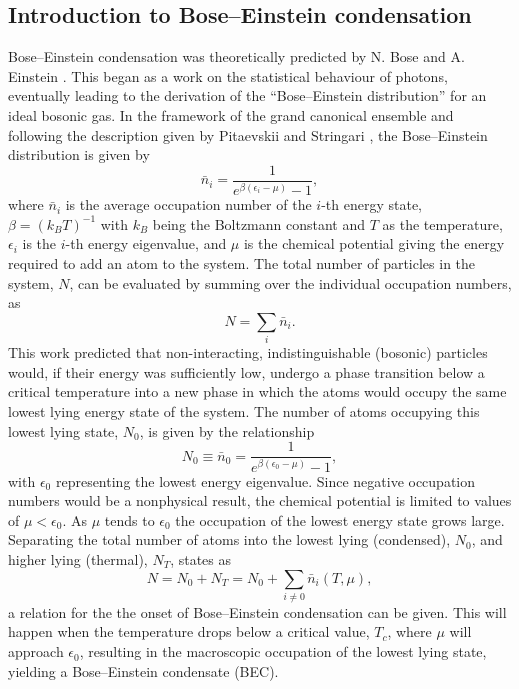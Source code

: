 \subsection{Introduction to Bose--Einstein condensation}\label{sub:becintro}
Bose--Einstein condensation was theoretically predicted by N. Bose and A. Einstein \cite{BEC:Ketterle_revmod_2002}. This began as a work on the statistical behaviour of photons, eventually leading to the derivation of the ``Bose--Einstein distribution'' for an ideal bosonic gas.
In the framework of the grand canonical ensemble and following the description given by Pitaevskii and Stringari \cite[chap. 2]{BK:Pitaevskii_Stringari_2003}, the Bose--Einstein distribution is given by
\begin{equation}
\bar{n}_i = \frac{1}{e^{\beta(\epsilon_i - \mu)} -1},
\end{equation}
where $\bar{n}_i$ is the average occupation number of the $i$-th energy state, $\beta=(k_BT)^{-1}$ with $k_B$ being the Boltzmann constant and $T$ as the temperature, $\epsilon_i$ is the $i$-th energy eigenvalue, and $\mu$ is the chemical potential giving the energy required to add an atom to the system.
The total number of particles in the system, $N$, can be evaluated by summing over the individual occupation numbers, as
\begin{equation}
N=\displaystyle\sum_i \bar{n}_i.
\end{equation}
This work predicted that non-interacting, indistinguishable (bosonic) particles would, if their energy was sufficiently low, undergo a phase transition below a critical temperature into a new phase in which the atoms would occupy the same lowest lying energy state of the system. The number of atoms occupying this lowest lying state, $N_0$, is given by the relationship
\begin{equation}
N_0 \equiv \bar{n}_0 = \frac{1}{e^{\beta(\epsilon_0 - \mu)} - 1},
\end{equation}
with $\epsilon_0$ representing the lowest energy eigenvalue. Since negative occupation numbers would be a nonphysical result, the chemical potential is limited to values of $\mu < \epsilon_0$. As $\mu$ tends to $\epsilon_0$ the occupation of the lowest energy state grows large. Separating the total number of atoms into the lowest lying (condensed), $N_0$, and higher lying (thermal), $N_T$, states as
\begin{equation}
N = N_0 + N_T = N_0 + \displaystyle\sum_{i\neq 0}\bar{n}_i(T,\mu),
\end{equation}
a relation for the the onset of Bose--Einstein condensation can be given. This will happen when the temperature drops below a critical value, $T_c$, where $\mu$ will approach $\epsilon_0$, resulting in the macroscopic occupation of the lowest lying state, yielding a Bose--Einstein condensate (BEC).

